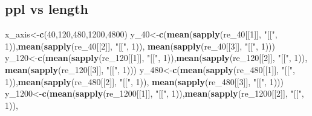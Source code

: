 \documentclass[
]{article}
\newenvironment{Shaded}{\begin{snugshade}}{\end{snugshade}}
\newcommand{\DecValTok}[1]{\textcolor[rgb]{0.00,0.00,0.81}{#1}}
\newcommand{\KeywordTok}[1]{\textcolor[rgb]{0.13,0.29,0.53}{\textbf{#1}}}
\newcommand{\NormalTok}[1]{#1}
\newcommand{\StringTok}[1]{\textcolor[rgb]{0.31,0.60,0.02}{#1}}
\begin{document}
\hypertarget{ppl-vs-length}{%
\subsection{ppl vs length}\label{ppl-vs-length}}

\begin{Shaded}
\begin{Highlighting}[]
\NormalTok{x_axis<-}\KeywordTok{c}\NormalTok{(}\DecValTok{40}\NormalTok{,}\DecValTok{120}\NormalTok{,}\DecValTok{480}\NormalTok{,}\DecValTok{1200}\NormalTok{,}\DecValTok{4800}\NormalTok{)}
\NormalTok{y_}\DecValTok{40}\NormalTok{<-}\KeywordTok{c}\NormalTok{(}\KeywordTok{mean}\NormalTok{(}\KeywordTok{sapply}\NormalTok{(re_}\DecValTok{40}\NormalTok{[[}\DecValTok{1}\NormalTok{]], }\StringTok{"[["}\NormalTok{, }\DecValTok{1}\NormalTok{)),}\KeywordTok{mean}\NormalTok{(}\KeywordTok{sapply}\NormalTok{(re_}\DecValTok{40}\NormalTok{[[}\DecValTok{2}\NormalTok{]], }\StringTok{"[["}\NormalTok{, }\DecValTok{1}\NormalTok{)),}
        \KeywordTok{mean}\NormalTok{(}\KeywordTok{sapply}\NormalTok{(re_}\DecValTok{40}\NormalTok{[[}\DecValTok{3}\NormalTok{]], }\StringTok{"[["}\NormalTok{, }\DecValTok{1}\NormalTok{)))}
\NormalTok{y_}\DecValTok{120}\NormalTok{<-}\KeywordTok{c}\NormalTok{(}\KeywordTok{mean}\NormalTok{(}\KeywordTok{sapply}\NormalTok{(re_}\DecValTok{120}\NormalTok{[[}\DecValTok{1}\NormalTok{]], }\StringTok{"[["}\NormalTok{, }\DecValTok{1}\NormalTok{)),}\KeywordTok{mean}\NormalTok{(}\KeywordTok{sapply}\NormalTok{(re_}\DecValTok{120}\NormalTok{[[}\DecValTok{2}\NormalTok{]], }\StringTok{"[["}\NormalTok{, }\DecValTok{1}\NormalTok{)),}
        \KeywordTok{mean}\NormalTok{(}\KeywordTok{sapply}\NormalTok{(re_}\DecValTok{120}\NormalTok{[[}\DecValTok{3}\NormalTok{]], }\StringTok{"[["}\NormalTok{, }\DecValTok{1}\NormalTok{)))}
\NormalTok{y_}\DecValTok{480}\NormalTok{<-}\KeywordTok{c}\NormalTok{(}\KeywordTok{mean}\NormalTok{(}\KeywordTok{sapply}\NormalTok{(re_}\DecValTok{480}\NormalTok{[[}\DecValTok{1}\NormalTok{]], }\StringTok{"[["}\NormalTok{, }\DecValTok{1}\NormalTok{)),}\KeywordTok{mean}\NormalTok{(}\KeywordTok{sapply}\NormalTok{(re_}\DecValTok{480}\NormalTok{[[}\DecValTok{2}\NormalTok{]], }\StringTok{"[["}\NormalTok{, }\DecValTok{1}\NormalTok{)),}
        \KeywordTok{mean}\NormalTok{(}\KeywordTok{sapply}\NormalTok{(re_}\DecValTok{480}\NormalTok{[[}\DecValTok{3}\NormalTok{]], }\StringTok{"[["}\NormalTok{, }\DecValTok{1}\NormalTok{)))}
\NormalTok{y_}\DecValTok{1200}\NormalTok{<-}\KeywordTok{c}\NormalTok{(}\KeywordTok{mean}\NormalTok{(}\KeywordTok{sapply}\NormalTok{(re_}\DecValTok{1200}\NormalTok{[[}\DecValTok{1}\NormalTok{]], }\StringTok{"[["}\NormalTok{, }\DecValTok{1}\NormalTok{)),}\KeywordTok{mean}\NormalTok{(}\KeywordTok{sapply}\NormalTok{(re_}\DecValTok{1200}\NormalTok{[[}\DecValTok{2}\NormalTok{]], }\StringTok{"[["}\NormalTok{, }\DecValTok{1}\NormalTok{)),}

\end{Highlighting}
\end{Shaded}
\end{document}
